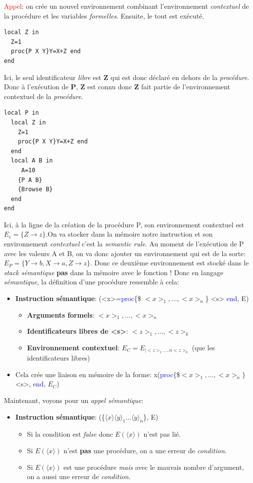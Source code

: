 \documentclass{report}
\begin{document}
\textcolor{red}{Appel}: on crée un nouvel environnement combinant l'environnement \textit{contextuel} de la procédure et les variables \textit{formelles}. Ensuite, le tout est exécuté.
\begin{lstlisting}
local Z in 
  Z=1
  proc{P X Y}Y=X+Z end
end
\end{lstlisting}
Ici, le seul identificateur \textit{libre} est \textbf{Z} qui est donc déclaré en dehors de la \textit{procédure}. Donc à l'exécution de \textbf{P}, \textbf{Z} est connu donc \textbf{Z} fait partie de l'environnement contextuel de la \textit{procédure}.
\begin{lstlisting}
local P in
  local Z in 
    Z=1
    proc{P X Y}Y=X+Z end
  end
  local A B in
     A=10
    {P A B}
    {Browse B}
  end
end 
\end{lstlisting}
Ici, à la ligne de la création de la procédure P, son environnement contextuel est $E_c = \{Z \rightarrow z\}$.On va stocker dans la mémoire notre instruction et son environnement \textit{contextuel} c'est la \textit{semantic rule}. Au moment de l'exécution de P avec les valeurs A et B, on va donc ajouter un environnement qui est de la sorte: $E_P = \{Y \rightarrow b, X \rightarrow a, Z \rightarrow z\}$. Donc ce deuxième environnement est stocké dans le \textit{stack sémantique} \textbf{pas} dans la mémoire avec le fonction !
Donc en langage \textit{sémantique}, la définition d'une procédure ressemble à cela:
\begin{itemize}
\item \textbf{Instruction sémantique}: (<x>=\textcolor{blue}{proc}\{\$ $<x>_1, ..., <x>_n$\} <s> \textcolor{blue}{end}, E)
\begin{itemize}
\item \textbf{Arguments formels}: $<x>_1, ..., <x>_n$
\item \textbf{Identificateurs libres de <s>}: $<z>_1, ..., <z>_k$
\item \textbf{Environnement contextuel}: $E_C = E_{|<z>_1, ...n <z>_k}$ (que les identificateurs libres)
\end{itemize}
\item Cela crée une liaison en mémoire de la forme: x(\textcolor{blue}{proc}$\{\$<x>_1, ..., <x>_n\}$<s>, \textcolor{blue}{end}, $E_C$)
\end{itemize}
Maintenant, voyons pour un \textit{appel sémantique}:
\begin{itemize}
\item \textbf{Instruction sémantique}: (\{$\langle x \rangle \langle y \rangle_1 ... \langle y \rangle_n$\}, E)
\begin{itemize}
\item Si la condition est \textit{false} donc $E(\langle x \rangle)$ n'est pas lié.
\item Si $E(\langle x \rangle)$ n'est \textbf{pas} une procédure, on a une erreur de \textit{condition}.
\item Si $E(\langle x \rangle)$ est une procédure \textit{mais} avec le mauvais nombre d'argument, on a aussi une erreur de \textit{condition}.
\end{itemize}
\end{itemize}
\end{document}
